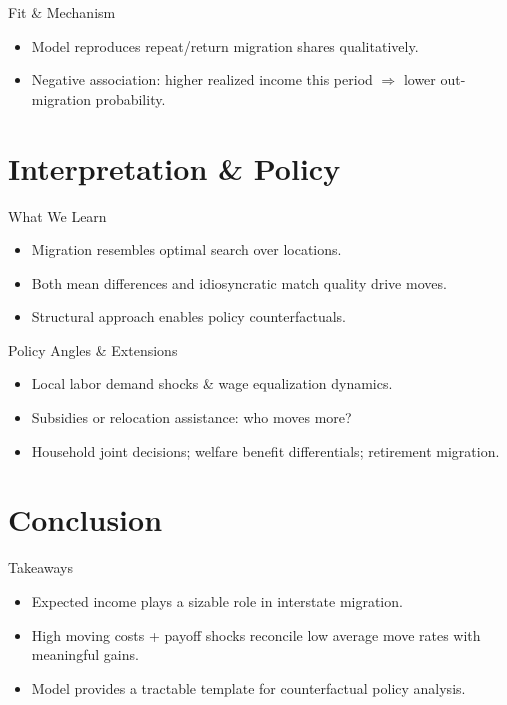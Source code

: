 \documentclass[aspectratio=169,professionalfonts]{beamer}
\begin{document}
\begin{frame}{Fit \& Mechanism}
  \begin{itemize}
    \item Model reproduces repeat/return migration shares qualitatively.
    \item Negative association: higher realized income this period $\Rightarrow$ lower out-migration probability.
  \end{itemize}
\end{frame}

\section{Interpretation \& Policy}

\begin{frame}{What We Learn}
  \begin{itemize}
    \item Migration resembles optimal search over locations.
    \item Both mean differences and idiosyncratic match quality drive moves.
    \item Structural approach enables policy counterfactuals.
  \end{itemize}
\end{frame}

\begin{frame}{Policy Angles \& Extensions}
  \begin{itemize}
    \item Local labor demand shocks \& wage equalization dynamics.
    \item Subsidies or relocation assistance: who moves more?
    \item Household joint decisions; welfare benefit differentials; retirement migration.
  \end{itemize}
\end{frame}

\section{Conclusion}

\begin{frame}{Takeaways}
  \begin{itemize}
    \item Expected income plays a sizable role in interstate migration.
    \item High moving costs + payoff shocks reconcile low average move rates with meaningful gains.
    \item Model provides a tractable template for counterfactual policy analysis.
  \end{itemize}
\end{frame}
\end{document}
